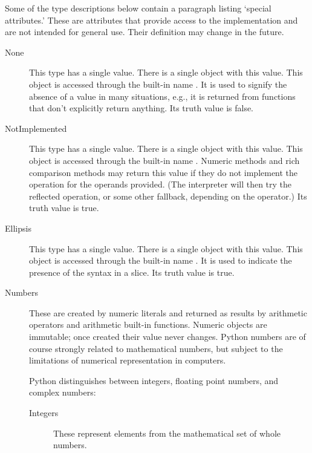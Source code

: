 Some of the type descriptions below contain a paragraph listing
`special attributes.'  These are attributes that provide access to the
implementation and are not intended for general use.  Their definition
may change in the future.

\begin{description}

\item[None]
This type has a single value.  There is a single object with this value.
This object is accessed through the built-in name .
It is used to signify the absence of a value in many situations, e.g.,
it is returned from functions that don't explicitly return anything.
Its truth value is false.

\item[NotImplemented]
This type has a single value.  There is a single object with this value.
This object is accessed through the built-in name .
Numeric methods and rich comparison methods may return this value if
they do not implement the operation for the operands provided.  (The
interpreter will then try the reflected operation, or some other
fallback, depending on the operator.)  Its truth value is true.

\item[Ellipsis]
This type has a single value.  There is a single object with this value.
This object is accessed through the built-in name .
It is used to indicate the presence of the  syntax in a
slice.  Its truth value is true.

\item[Numbers]
These are created by numeric literals and returned as results by
arithmetic operators and arithmetic built-in functions.  Numeric
objects are immutable; once created their value never changes.  Python
numbers are of course strongly related to mathematical numbers, but
subject to the limitations of numerical representation in computers.

Python distinguishes between integers, floating point numbers, and
complex numbers:

\begin{description}
\item[Integers]
These represent elements from the mathematical set of whole numbers.


\end{description}
\end{description}
